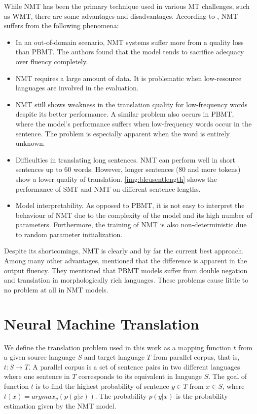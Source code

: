 While NMT has been the primary technique used in various MT challenges, such as WMT, there are some advantages and disadvantages. According to , NMT suffers from the following phenomena:
\begin{itemize}
    \item In an out-of-domain scenario, NMT systems suffer more from a quality loss than PBMT. The authors found that the model tends to sacrifice adequacy over fluency completely.

    \item NMT requires a large amount of data. It is problematic when low-resource languages are involved in the evaluation.

    \item NMT still shows weakness in the translation quality for low-frequency words despite its better performance. A similar problem also occurs in PBMT, where the model's performance suffers when low-frequency words occur in the sentence. The problem is especially apparent when the word is entirely unknown.

    \item Difficulties in translating long sentences. NMT can perform well in short sentences up to 60 words. However, longer sentences (80 and more tokens) show a lower quality of translation. \cref{img:bleusentlength} shows the performance of SMT and NMT on different sentence lengths.

    \item Model interpretability. As opposed to PBMT, it is not easy to interpret the behaviour of NMT due to the complexity of the model and its high number of parameters. Furthermore, the training of NMT is also non-deterministic due to random parameter initialization.
\end{itemize}

Despite its shortcomings, NMT is clearly and by far the current best approach. Among many other advantages,  mentioned that the difference is apparent in the output fluency. They mentioned that PBMT models suffer from double negation and translation in morphologically rich languages. These problems cause little to no problem at all in NMT models.

\section{Neural Machine Translation}
\label{sec:bm_nmt}
We define the translation problem used in this work as a mapping function $t$ from a given source language $S$ and target language $T$ from parallel corpus, that is, $t : S \rightarrow T$. A parallel corpus is a set of sentence pairs in two different languages where one sentence in $T$ corresponds to its equivalent in language $S$. The goal of function $t$ is to find the highest probability of sentence $y \in T$ from $x \in S$, where $t(x) = argmax_y(p(y|x))$. The probability $p(y|x)$ is the probability estimation given by the NMT model.

